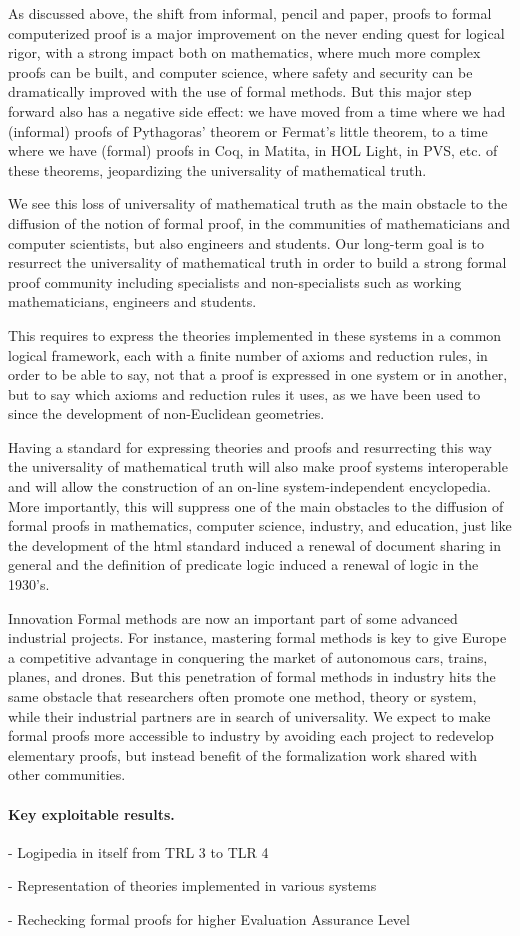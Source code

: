 As discussed above, the shift from informal, pencil and paper, proofs
to formal computerized proof is a major improvement on the never
ending quest for logical rigor, with a strong impact both on
mathematics, where much more complex proofs can be built, and computer
science, where safety and security can be dramatically improved with
the use of formal methods. But this major step forward also has a
negative side effect: we have moved from a time where we had
(informal) proofs of Pythagoras' theorem or Fermat's little theorem,
to a time where we have (formal) proofs in Coq, in Matita, in HOL
Light, in PVS, etc. of these theorems, jeopardizing the universality
of mathematical truth.

We see this loss of universality of mathematical truth as the main
obstacle to the diffusion of the notion of formal proof, in the
communities of mathematicians and computer scientists, but also
engineers and students. Our long-term goal is to resurrect the
universality of mathematical truth in order to build a strong formal
proof community including specialists and non-specialists such as
working mathematicians, engineers and students.

This requires to express the theories implemented in these systems in
a common logical framework, each with a finite number of axioms and
reduction rules, in order to be able to say, not that a proof is
expressed in one system or in another, but to say which axioms and
reduction rules it uses, as we have been used to since the development
of non-Euclidean geometries.

Having a standard for expressing theories and proofs and resurrecting
this way the universality of mathematical truth will also make proof
systems interoperable and will allow the construction of an on-line
system-independent encyclopedia. More importantly, this will suppress
one of the main obstacles to the diffusion of formal proofs in
mathematics, computer science, industry, and education, just like the
development of the html standard induced a renewal of document sharing
in general and the definition of predicate logic induced a renewal of
logic in the 1930's.

Innovation Formal methods are now an important part of some advanced
industrial projects. For instance, mastering formal methods is key to
give Europe a competitive advantage in conquering the market of
autonomous cars, trains, planes, and drones. But this penetration of
formal methods in industry hits the same obstacle that researchers
often promote one method, theory or system, while their industrial
partners are in search of universality. We expect to make formal
proofs more accessible to industry by avoiding each project to
redevelop elementary proofs, but instead benefit of the formalization
work shared with other communities.


\paragraph{Key exploitable results.}

- Logipedia in itself from TRL 3 to TLR 4

- Representation of theories implemented in various systems

- Rechecking formal proofs for higher Evaluation Assurance Level

